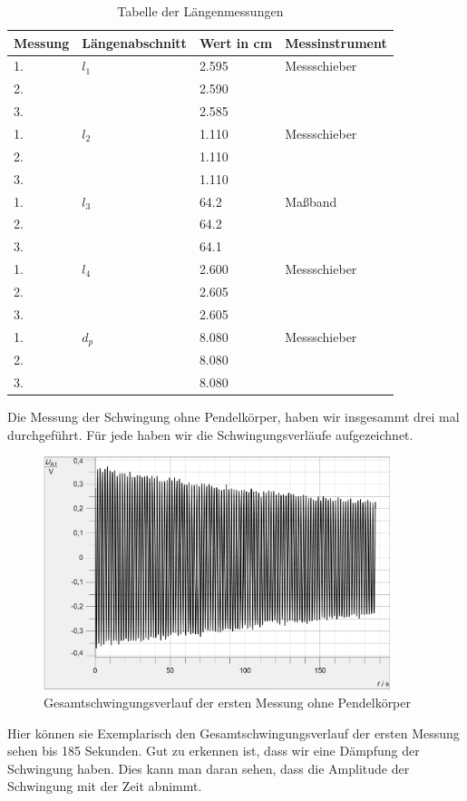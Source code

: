 \documentclass[twoside]{protokoll}
\begin{document}
\begin{table}[H]
        \centering
        \begin{tabularx}{1.0\textwidth}{X l X X} %
            \toprule
            \textbf{Messung} & \textbf{Längenabschnitt} & \textbf{Wert in cm} & \textbf{Messinstrument} \\
            \midrule
            1. & $l_1$ & 2.595 & Messschieber \\
            2. & & 2.590 &\\ 
            3. & & 2.585 &\\
            \midrule
            1. & $l_2$ & 1.110 & Messschieber \\
            2. & & 1.110 &\\
            3. & & 1.110 &\\
            \midrule
            1. & $l_3$ & 64.2 & Maßband \\
            2. & & 64.2 &\\
            3. & & 64.1 &\\
            \midrule
            1. & $l_4$ & 2.600 & Messschieber \\
            2. & & 2.605 &\\
            3. & & 2.605 &\\
            \midrule
            1. & $d_p$ & 8.080 & Messschieber \\
            2. & & 8.080 &\\
            3. & & 8.080 &\\
            \bottomrule
        \end{tabularx}
        \caption{Tabelle der Längenmessungen}
        \label{tab:längen}
    \end{table}
     
Die Messung der Schwingung ohne Pendelkörper, haben wir insgesammt drei mal durchgeführt.
Für jede haben wir die Schwingungsverläufe aufgezeichnet.
\begin{figure}[H]
    \centering
    \includegraphics[width=0.9\textwidth]{plots/stange-1-komplett.pdf}
    \caption{Gesamtschwingungsverlauf der ersten Messung ohne Pendelkörper}
\end{figure}
Hier können sie Exemplarisch den Gesamtschwingungsverlauf der ersten Messung sehen bis 185 Sekunden.
Gut zu erkennen ist, dass wir eine Dämpfung der Schwingung haben.
Dies kann man daran sehen, dass die Amplitude der Schwingung mit der Zeit abnimmt. 
\end{document}
